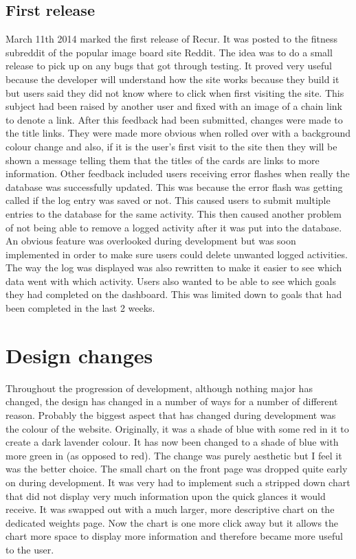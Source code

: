 \subsection{First release}
March 11th 2014 marked the first release of Recur. It was posted to the fitness subreddit of the popular image board site Reddit\citep{reddit:2005}. The idea was to do a small release to pick up on any bugs that got through testing. It proved very useful because the developer will understand how the site works because they build it but users said they did not know where to click when first visiting the site. This subject had been raised by another user and fixed with an image of a chain link to denote a link. After this feedback had been submitted, changes were made to the title links. They were made more obvious when rolled over with a background colour change and also, if it is the user's first visit to the site then they will be shown a message telling them that the titles of the cards are links to more information. Other feedback included users receiving error flashes when really the database was successfully updated. This was because the error flash was getting called if the log entry was saved or not. This caused users to submit multiple entries to the database for the same activity. This then caused another problem of not being able to remove a logged activity after it was put into the database. An obvious feature was overlooked during development but was soon implemented in order to make sure users could delete unwanted logged activities. The way the log was displayed was also rewritten to make it easier to see which data went with which activity. Users also wanted to be able to see which goals they had completed on the dashboard. This was limited down to goals that had been completed in the last 2 weeks.

\section{Design changes}
Throughout the progression of development, although nothing major has changed, the design has changed in a number of ways for a number of different reason. Probably the biggest aspect that has changed during development was the colour of the website. Originally, it was a shade of blue with some red in it to create a dark lavender colour. It has now been changed to a shade of blue with more green in (as opposed to red). The change was purely aesthetic but I feel it was the better choice. The small chart on the front page was dropped quite early on during development. It was very had to implement such a stripped down chart that did not display very much information upon the quick glances it would receive. It was swapped out with a much larger, more descriptive chart on the dedicated weights page. Now the chart is one more click away but it allows the chart more space to display more information and therefore became more useful to the user.


